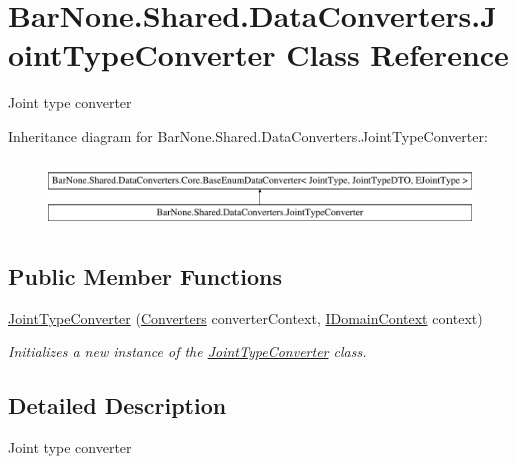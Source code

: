 \hypertarget{class_bar_none_1_1_shared_1_1_data_converters_1_1_joint_type_converter}{}\section{Bar\+None.\+Shared.\+Data\+Converters.\+Joint\+Type\+Converter Class Reference}
\label{class_bar_none_1_1_shared_1_1_data_converters_1_1_joint_type_converter}


Joint type converter  


Inheritance diagram for Bar\+None.\+Shared.\+Data\+Converters.\+Joint\+Type\+Converter\+:\begin{figure}[H]
\begin{center}
\leavevmode
\includegraphics[height=1.786284cm]{class_bar_none_1_1_shared_1_1_data_converters_1_1_joint_type_converter}
\end{center}
\end{figure}
\subsection*{Public Member Functions}
\begin{DoxyCompactItemize}
\item 
\mbox{\hyperlink{class_bar_none_1_1_shared_1_1_data_converters_1_1_joint_type_converter_a43dbfa3f0a581e3ec3f87bcca1719f78}{Joint\+Type\+Converter}} (\mbox{\hyperlink{class_bar_none_1_1_shared_1_1_data_converters_1_1_converters}{Converters}} converter\+Context, \mbox{\hyperlink{interface_bar_none_1_1_shared_1_1_core_1_1_i_domain_context}{I\+Domain\+Context}} context)
\begin{DoxyCompactList}\small\item\em Initializes a new instance of the \mbox{\hyperlink{class_bar_none_1_1_shared_1_1_data_converters_1_1_joint_type_converter}{Joint\+Type\+Converter}} class. \end{DoxyCompactList}\end{DoxyCompactItemize}


\subsection{Detailed Description}
Joint type converter 

